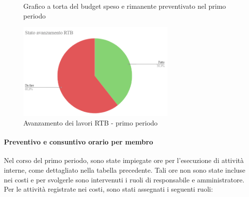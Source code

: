 \documentclass{article}
\begin{document}
\begin{figure}[h]
    \centering
    \begin{minipage}[b]{0.45\textwidth}
        \centering
        \caption{Grafico a torta del budget speso e rimanente preventivato nel primo periodo}
        \label{fig:GraficoTorta}
    \end{minipage}

    \vspace{1cm} %

    \begin{minipage}[b]{0.70\textwidth}
        \centering
        \includegraphics[width=0.7\textwidth]{../Images/avanzamento1Periodo.png}
        \caption{Avanzamento dei lavori RTB - primo periodo}
        \label{fig:AvRtb1}
    \end{minipage}
\end{figure}


\paragraph{Preventivo e consuntivo orario per membro}
Nel corso del primo periodo, sono state impiegate ore per l'esecuzione di attività interne, come dettagliato nella tabella precedente. Tali ore non sono state incluse nei costi e per svolgerle sono intervenuti i ruoli di responsabile e amministratore.
Per le attività registrate nei costi, sono stati assegnati i seguenti ruoli:
\end{document}
